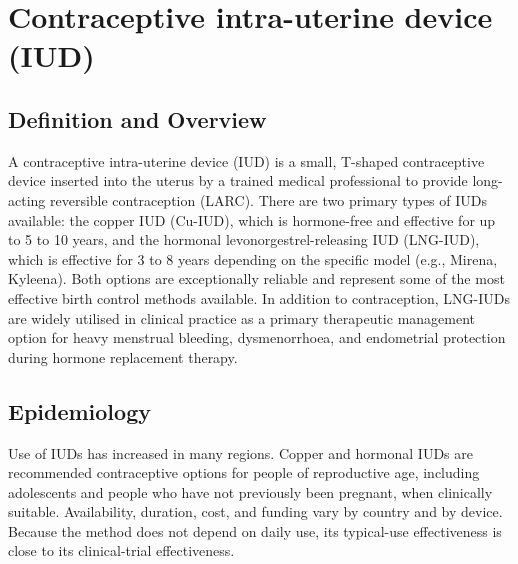 \chapter{Contraceptive intra-uterine device (IUD)}

\section*{Definition and Overview}
A contraceptive intra-uterine device (IUD) is a small, T-shaped contraceptive device inserted into the uterus by a trained medical professional to provide long-acting reversible contraception (LARC). There are two primary types of IUDs available: the copper IUD (Cu-IUD), which is hormone-free and effective for up to 5 to 10 years, and the hormonal levonorgestrel-releasing IUD (LNG-IUD), which is effective for 3 to 8 years depending on the specific model (e.g., Mirena, Kyleena). Both options are exceptionally reliable and represent some of the most effective birth control methods available. In addition to contraception, LNG-IUDs are widely utilised in clinical practice as a primary therapeutic management option for heavy menstrual bleeding, dysmenorrhoea, and endometrial protection during hormone replacement therapy.

\section*{Epidemiology}
Use of IUDs has increased in many regions. Copper and hormonal IUDs are recommended contraceptive options for people of reproductive age, including adolescents and people who have not previously been pregnant, when clinically suitable. Availability, duration, cost, and funding vary by country and by device. Because the method does not depend on daily use, its typical-use effectiveness is close to its clinical-trial effectiveness.

